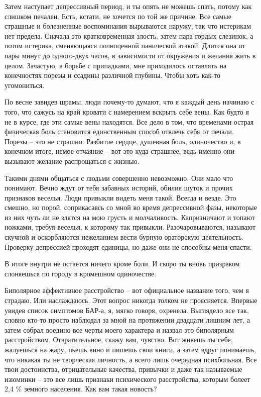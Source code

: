 \documentclass[
]{book}
\begin{document}
Затем наступает депрессивный период, и ты опять не можешь спать, потому как слишком печален. Есть, кстати, не хочется по той же причине. Все самые страшные и болезненные воспоминания вырываются наружу, так что истерикам нет предела. Сначала это кратковременная злость, затем пара гордых слезинок, а потом истерика, сменяющаяся полноценной панической атакой. Длится она от пары минут до одного-двух часов, в зависимости от окружения и желания жить в целом. Зачастую, в борьбе с припадками, мне приходилось оставлять на конечностях порезы и ссадины различной глубины. Чтобы хоть как-то угомониться.

По весне завидев шрамы, люди почему-то думают, что я каждый день начинаю с того, что сажусь на край кровати с намерением вскрыть себе вены. Как будто я не в курсе, где эти самые вены находятся. Все дело в том, что временами острая физическая боль становится единственным способ отвлечь себя от печали. Порезы -- это не страшно. Разбитое сердце, душевная боль, одиночество и, в конечном итоге, немое отчаяние -- вот это куда страшнее, ведь именно они вызывают желание распрощаться с жизнью.

Такими днями общаться с людьми совершенно невозможно. Они мало что понимают. Вечно ждут от тебя забавных историй, обилия шуток и прочих признаков веселья. Люди привыкли видеть меня такой. Всегда и везде. Это смешно, но порой, соприкасаясь со мной во время депрессивной фазы, некоторые из них чуть ли не злятся на мою грусть и молчаливость. Капризничают и топают ножками, требуя веселья, к которому так привыкли. Разочаровываются, называют скучной и оскорбляются нежеланием вести бурную ораторскую деятельность. Проверку депрессией проходят единицы, но даже они не способны меня спасти.

В итоге внутри не остается ничего кроме боли. И скоро ты вновь призраком слоняешься по городу в кромешном одиночестве.

Биполярное аффективное расстройство -- вот официальное название того, чем я страдаю. Или наслаждаюсь. Этот вопрос никогда толком не проясняется. Впервые увидев список симптомов БАР-а, я, мягко говоря, охренела. Выглядело все так, словно кто-то просто наблюдал за мной на протяжении двадцати лишним лет, а затем собрал воедино все черты моего характера и назвал это биполярным расстройством. Отвратительное, скажу вам, чувство. Вот живешь ты себе, жалуешься на жару, пьешь вино и пишешь свои книги, а затем вдруг понимаешь, что никакая ты не творческая личность, а всего лишь очередная психбольная. Все твои достоинства, отрицательные качества, привычки и даже так называемые изюминки -- это все лишь признаки психического расстройства, которым болеет 2,4 \% земного населения. Как вам такая новость?
\end{document}
